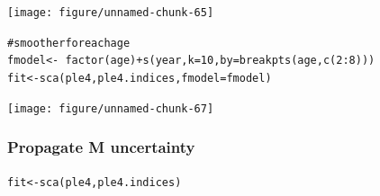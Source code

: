 \documentclass[a4paper,english,10pt]{article}\usepackage[]{graphicx}\usepackage[]{color}
\makeatletter
\newcommand{\hlnum}[1]{\textcolor[rgb]{0.2,0.2,0.2}{#1}}%
\newcommand{\hlcom}[1]{\textcolor[rgb]{0.2,0.267,0.4}{#1}}%
\newcommand{\hlopt}[1]{\textcolor[rgb]{0.2,0.2,0.2}{#1}}%
\newcommand{\hlstd}[1]{\textcolor[rgb]{0,0,0}{#1}}%
\newcommand{\hlkwb}[1]{\textcolor[rgb]{0.361,0.506,0.596}{#1}}%
\newcommand{\hlkwc}[1]{\textcolor[rgb]{0.361,0.506,0.596}{#1}}%
\newcommand{\hlkwd}[1]{\textcolor[rgb]{0.361,0.506,0.596}{#1}}%
\newenvironment{kframe}{%
 \def\at@end@of@kframe{}%
 \ifinner\ifhmode%
  \def\at@end@of@kframe{\end{minipage}}%
  \begin{minipage}{\columnwidth}%
 \fi\fi%
 \def\FrameCommand##1{\hskip\@totalleftmargin \hskip-\fboxsep
 \colorbox{shadecolor}{##1}\hskip-\fboxsep
     \hskip-\linewidth \hskip-\@totalleftmargin \hskip\columnwidth}%
 \MakeFramed {\advance\hsize-\width
   \@totalleftmargin\z@ \linewidth\hsize
   \@setminipage}}%
 {\par\unskip\endMakeFramed%
 \at@end@of@kframe}
\newenvironment{knitrout}{}{} %
\makeatother
\begin{document}
\begin{knitrout}
\color{fgcolor}

{\centering \texttt{[image: figure/unnamed-chunk-65]} 

}



\end{knitrout}


\begin{knitrout}
\color{fgcolor}\begin{kframe}
\begin{alltt}
\hlcom{# smoother for each age}
\hlstd{fmodel} \hlkwb{<-} \hlopt{~}\hlkwd{factor}\hlstd{(age)} \hlopt{+} \hlkwd{s}\hlstd{(year,} \hlkwc{k} \hlstd{=} \hlnum{10}\hlstd{,} \hlkwc{by} \hlstd{=} \hlkwd{breakpts}\hlstd{(age,} \hlkwd{c}\hlstd{(}\hlnum{2}\hlopt{:}\hlnum{8}\hlstd{)))}
\hlstd{fit} \hlkwb{<-} \hlkwd{sca}\hlstd{(ple4, ple4.indices,} \hlkwc{fmodel} \hlstd{= fmodel)}
\end{alltt}
\end{kframe}
\end{knitrout}


\begin{knitrout}
\color{fgcolor}

{\centering \texttt{[image: figure/unnamed-chunk-67]} 

}



\end{knitrout}


\subsubsection{Propagate M uncertainty}


\begin{knitrout}
\color{fgcolor}\begin{kframe}
\begin{alltt}
\hlstd{fit} \hlkwb{<-} \hlkwd{sca}\hlstd{(ple4, ple4.indices)}
\end{alltt}
\end{kframe}
\end{knitrout}
\end{document}
